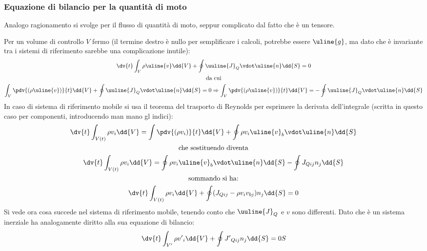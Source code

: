 \subsubsection{Equazione di bilancio per la quantità di moto}
Analogo ragionamento si svolge per il flusso di quantità di moto, seppur complicato dal fatto che è un tensore. 

Per un volume di controllo $V$ fermo (il termine destro è nullo per semplificare i calcoli, potrebbe essere $\uline{g}$, ma dato che è invariante tra i sistemi di riferimento sarebbe una complicazione inutile):
%
	\begin{equation*}
		\begin{gathered}
			\dv{t} \int_V \rho \uline{v} \dd{V} + \oint \uuline{J}_Q \vdot \uline{n} \dd{S} = 0 \\
			\text{da cui} \\
			\int_V\pdv{ (\rho \uline{v})}{t} \dd{V} + \oint \uuline{J}_Q \vdot \uline{n} \dd{S} = 0 \Rightarrow \int_V\pdv{ (\rho \uline{v})}{t} \dd{V} = - \oint \uuline{J}_Q \vdot \uline{n} \dd{S}
		\end{gathered}
	\end{equation*}
%
In caso di sistema di riferimento mobile si usa il teorema del trasporto di Reynolds per esprimere la derivata dell'integrale (scritta in questo caso per componenti, introducendo man mano gl indici):
	\begin{equation*}
		\begin{gathered}
			\dv{t} \int_{V(t)} \rho v_i \dd{V} = \int \pdv{(\rho v_i)}{t} \dd{V} + \oint \rho v_i \uline{v}_b \vdot \uline{n} \dd{S} \\
			\text{che sostituendo diventa} \\
			\dv{t} \int_{V(t)} \rho v_i \dd{V} = \oint \rho v_i \uline{v}_b \vdot \uline{n} \dd{S} - \oint J_{Qij} n_j \dd{S} \\
			\text{sommando si ha:} \\
			\dv{t} \int_{V(t)} \rho v_i \dd{V} + \oint (J_{Qij} -  \rho v_i v_{bj}) n_j \dd{S} = 0
		\end{gathered}
	\end{equation*}
%
Si vede ora cosa succede nel sistema di riferimento mobile, tenendo conto che $\uuline{J}_Q$ e $v$ sono differenti.
Dato che è un sistema inerziale ha analogamente diritto alla sua equazione di bilancio:
%
	\begin{equation*}
		\dv{t} \int_{V'} \rho {v'}_i \dd{V} + \oint {J'}_{Qij} n_j \dd{S} = 0S
	\end{equation*}
